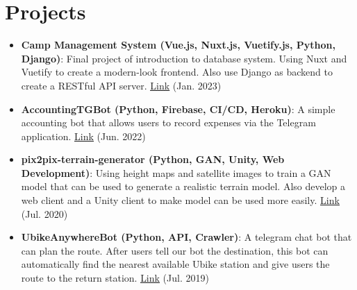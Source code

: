 \documentclass[a4paper8pt]{extarticle}
\newcommand{\resumeItem}[2]{
  \item\small{
    \textbf{#1}{: #2 \vspace{-2pt}}
  }
}
\newcommand{\resumeSubItem}[2]{\resumeItem{#1}{#2}\vspace{-3pt}}
\newcommand{\resumeSubHeadingListStart}{\begin{itemize}[leftmargin=*]}
\newcommand{\resumeSubHeadingListEnd}{\end{itemize}}
\begin{document}
\vspace{-5pt}
\section{Projects}
\resumeSubHeadingListStart
\resumeSubItem{Camp Management System (Vue.js, Nuxt.js, Vuetify.js, Python, Django)}{Final project of introduction to database system. Using Nuxt and Vuetify to create a modern-look frontend. Also use Django as backend to create a RESTful API server. \href{https://github.com/jayin92/camp-management-system}{\underline{Link}} (Jan. 2023)}
\resumeSubItem{AccountingTGBot (Python, Firebase, CI/CD, Heroku)}{A simple accounting bot that allows users to record expenses via the Telegram application. \href{https://github.com/jayin92/AccountingTGBot}{\underline{Link}} (Jun. 2022)}
\vspace{2pt}
\resumeSubItem{pix2pix-terrain-generator (Python, GAN, Unity, Web Development)}{Using height maps and satellite images to train a GAN model that can be used to generate a realistic terrain model. Also develop a web client and a Unity client to make model can be used more easily. \href{https://github.com/jayin92/pix2pix-terrain-generator}{\underline{Link}} (Jul. 2020)}
\vspace{2pt}
\resumeSubItem{UbikeAnywhereBot (Python, API, Crawler)}{A telegram chat bot that can plan the route. After users tell our bot the destination, this bot can automatically find the nearest available Ubike station and give users the route to the return station. \href{https://github.com/jayin92/UBikeAnywhereBot}{\underline{Link}} (Jul. 2019)}
\resumeSubHeadingListEnd
\vspace{-5pt}

\end{document}
